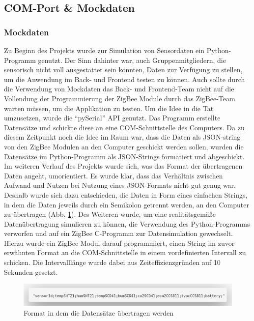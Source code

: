 \documentclass[]{article}
\begin{document}
			\subsection{COM-Port \& Mockdaten}
			
			\subsubsection{Mockdaten}
			Zu Beginn des Projekts wurde zur Simulation von Sensordaten ein Python-Programm genutzt. Der Sinn dahinter war, auch Gruppenmitgliedern, die sensorisch nicht voll ausgestattet sein konnten, Daten zur Verfügung zu stellen, um die Anwendung im Back- und Frontend testen zu können. Auch sollte durch die Verwendung von Mockdaten das Back- und Frontend-Team nicht auf die Vollendung der Programmierung der ZigBee Module durch das ZigBee-Team warten müssen, um die Applikation zu testen.\newline			
Um die Idee in die Tat umzusetzen, wurde die “pySerial” API genutzt. Das Programm erstellte Datensätze und schickte diese an eine COM-Schnittstelle des Computers. Da zu diesem Zeitpunkt noch die Idee im Raum war, dass die Daten als JSON-string von den ZigBee Modulen an den Computer geschickt werden sollen, wurden die Datensätze im Python-Programm als JSON-Strings formatiert und abgeschickt.\newline
Im weiteren Verlauf des Projekts wurde sich, was das Format der übertragenen Daten angeht, umorientiert. Es wurde klar, dass das Verhältnis zwischen Aufwand und Nutzen bei Nutzung eines JSON-Formats nicht gut genug war. Deshalb wurde sich dazu entschieden, die Daten in Form eines einfachen Strings, in dem die Daten jeweils durch ein Semikolon getrennt werden, an den Computer zu  übertragen (Abb. \ref{img:data_format}). Des Weiteren wurde, um eine realitätsgemäße Datenübertragung simulieren zu können, die Verwendung des Python-Programms verworfen und auf ein ZigBee C-Programm zur Datensimulation gewechselt. Hierzu wurde ein ZigBee Modul darauf programmiert, einen String im zuvor erwähnten Format an die COM-Schnittstelle in einem vordefinierten Intervall zu schicken. Die Intervalllänge wurde dabei aus Zeiteffizienzgründen auf 10 Sekunden gesetzt.
					\begin{figure}[!h]
						\centering
						\includegraphics[scale=0.223]{images/data_format}
						\caption{Format in dem die Datensätze übertragen werden}
						\label{img:data_format}
					\end{figure}
\end{document}
